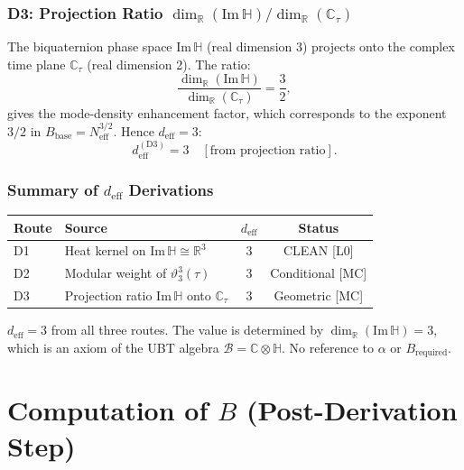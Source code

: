 \documentclass[12pt,a4paper]{article}
\theoremstyle{definition}
\theoremstyle{remark}
\begin{document}
\subsubsection*{D3: Projection Ratio $\dim_\mathbb{R}(\mathrm{Im}\,\mathbb{H})/\dim_\mathbb{R}(\mathbb{C}_\tau)$}

The biquaternion phase space Im$\,\mathbb{H}$ (real dimension 3) projects onto
the complex time plane $\mathbb{C}_\tau$ (real dimension 2).  The ratio:
\begin{equation}
  \frac{\dim_\mathbb{R}(\mathrm{Im}\,\mathbb{H})}{\dim_\mathbb{R}(\mathbb{C}_\tau)}
  = \frac{3}{2},
\end{equation}
gives the mode-density enhancement factor, which corresponds to the exponent $3/2$
in $B_{\mathrm{base}} = N_{\mathrm{eff}}^{3/2}$.  Hence $d_{\mathrm{eff}} = 3$:
\begin{equation}
  d_{\mathrm{eff}}^{(\mathrm{D3})} = 3 \quad [\text{from projection ratio}].
\end{equation}

\subsubsection*{Summary of $d_{\mathrm{eff}}$ Derivations}

\begin{center}
\renewcommand{\arraystretch}{1.3}
\begin{tabular}{llcc}
\toprule
Route & Source & $d_{\mathrm{eff}}$ & Status \\
\midrule
D1 & Heat kernel on Im$\,\mathbb{H}\cong\mathbb{R}^3$ & 3 & CLEAN [L0] \\
D2 & Modular weight of $\vartheta_3^3(\tau)$ & 3 & Conditional [MC] \\
D3 & Projection ratio Im$\,\mathbb{H}$ onto $\mathbb{C}_\tau$ & 3 & Geometric [MC] \\
\bottomrule
\end{tabular}
\end{center}

\begin{resultbox}
$d_{\mathrm{eff}} = 3$ from all three routes.
The value is determined by $\dim_\mathbb{R}(\mathrm{Im}\,\mathbb{H}) = 3$,
which is an axiom of the UBT algebra $\mathcal{B} = \mathbb{C}\otimes\mathbb{H}$.
No reference to $\alpha$ or $B_{\mathrm{required}}$.
\end{resultbox}

\section{Computation of $B$ (Post-Derivation Step)}
\label{sec:B_computation}
\end{document}
